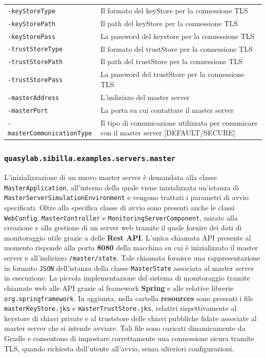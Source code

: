 \begin{table}[H]
    \begin{tabularx}{\linewidth}{ l X }
        \texttt{-keyStoreType}   & Il formato del keyStore per la connessione TLS   \\
        \texttt{-keyStorePath}   & Il path del keyStore per la connessione TLS       \\
        \texttt{-keyStorePass}   & La password del keystore per la connessione TLS   \\
        \texttt{-trustStoreType} & Il formato del trustStore per la connessione TLS \\
        \texttt{-trustStorePath} & Il path del trustStore per la connessione TLS     \\
        \texttt{-trustStorePass} & La password del trustStore per la connessione TLS \\
        \texttt{-masterAddress}  & L'indirizzo del master server                     \\
        \texttt{-masterPort}     & La porta su cui contattare il master server       \\
        \texttt{-masterCommunicationType} & Il tipo di comunicazione utilizzata per comunicare con il master server {[}DEFAULT/SECURE{]}
    \end{tabularx}
\end{table}

\subsubsection{\texttt{quasylab.sibilla.examples.servers.master}}

L'inizializzazione di un nuovo master server è demandata alla classe \texttt{MasterApplication}, all'interno della quale viene inizializzata un'istanza di \texttt{MasterServerSimulationEnvironment} e vengono trattati i parametri di avvio specificati.
Oltre alla specifica classe di avvio sono presenti anche le classi \texttt{WebConfig}, \texttt{MasterController} e \texttt{MonitoringServerComponent}, mirate alla creazione e alla gestione di un server web tramite il quale fornire dei dati di monitoraggio utile grazie a delle \textbf{Rest API}. L'unica chiamata API presente al momento risponde alla porta \textbf{8080} della macchina su cui è inizializzato il master server e all'indirizzo \texttt{/master/state}. Tale chiamata fornisce una rappresentazione in formato \texttt{JSON} dell'istanza della classe \texttt{MasterState} associata al master server in esecuzione.
La piccola implementazione del sistema di monitoraggio tramite chiamate web alle API grazie al framework \textbf{Spring} e alle relative librerie \texttt{org.springframework}.
In aggiunta, nella cartella \textbf{resources} sono presenti i file \texttt{masterKeyStore.jks} e \texttt{masterTrustStore.jks}, relativi rispettivamente al keystore di chiavi private e al truststore delle chiavi pubbliche fidate associate al master server che si intende avviare. Tali file sono caricati dinamicamente da Gradle e consentono di impostare correttamente una connessione sicura tramite TLS, quando richiesta dall'utente all'avvio, senza ulteriori configurazioni.

